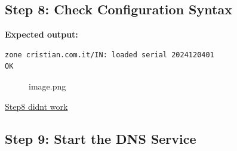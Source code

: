 \subsection{Step 8: Check Configuration
Syntax}\label{step-8-check-configuration-syntax}

\begin{Shaded}
\begin{Highlighting}[]

\end{Highlighting}
\end{Shaded}

\textbf{Expected output:}

\begin{verbatim}
zone cristian.com.it/IN: loaded serial 2024120401
OK
\end{verbatim}

\begin{figure}
\centering
{}
\caption{image.png}
\end{figure}

\href{Third\%20-\%20DNS\%20263f56fc503e80ddb361c216e75fd3bf/Step8\%20didnt\%20work\%20265f56fc503e807a80cbcc525efe949d.md}{Step8
didnt work}

\subsection{Step 9: Start the DNS
Service}\label{step-9-start-the-dns-service}

